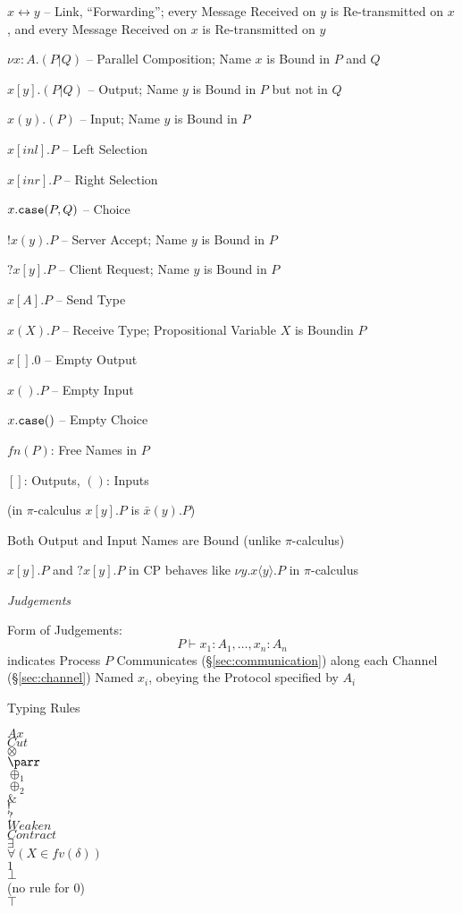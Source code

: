 $x \leftrightarrow y$ -- Link, ``Forwarding''; every Message Received on
$y$ is Re-transmitted on $x$, and every Message Received on $x$ is
Re-transmitted on $y$

$\nu x:A.(P|Q)$ -- Parallel Composition; Name $x$ is Bound in $P$ and
$Q$

$x[y].(P|Q)$ -- Output; Name $y$ is Bound in $P$ but not in $Q$

$x(y).(P)$ -- Input; Name $y$ is Bound in $P$

$x[inl].P$ -- Left Selection

$x[inr].P$ -- Right Selection

$x.\mathtt{case}(P,Q)$ -- Choice

$!x(y).P$ -- Server Accept; Name $y$ is Bound in $P$

$?x[y].P$ -- Client Request; Name $y$ is Bound in $P$

$x[A].P$ -- Send Type

$x(X).P$ -- Receive Type; Propositional Variable $X$ is Boundin $P$

$x[].0$ -- Empty Output

$x().P$ -- Empty Input

$x.\mathtt{case}()$ -- Empty Choice


\asterism


$fn(P)$: Free Names in $P$

$[]$: Outputs, $()$: Inputs

(in $\pi$-calculus $x[y].P$ is $\bar{x}(y).P$)

Both Output and Input Names are Bound (unlike $\pi$-calculus)

$x[y].P$ and $?x[y].P$ in CP behaves like $\nu y.x\langle y \rangle.P$
in $\pi$-calculus


\asterism


\emph{Judgements}

Form of Judgements:
\[
  P \vdash x_1 : A_1, \ldots, x_n : A_n
\]
indicates Process $P$ Communicates (\S\ref{sec:communication}) along
each Channel (\S\ref{sec:channel}) Named $x_i$, obeying the Protocol
specified by $A_i$


Typing Rules

$Ax$ \\
$Cut$ \\
$\otimes$ \\
$\parr$ \\
$\oplus_1$ \\
$\oplus_2$ \\
$\&$ \\
$!$ \\
$?$ \\
$Weaken$ \\
$Contract$ \\
$\exists$ \\
$\forall (X \in fv(\delta))$ \\
$1$ \\
$\bot$ \\
(no rule for $0$) \\
$\top$


